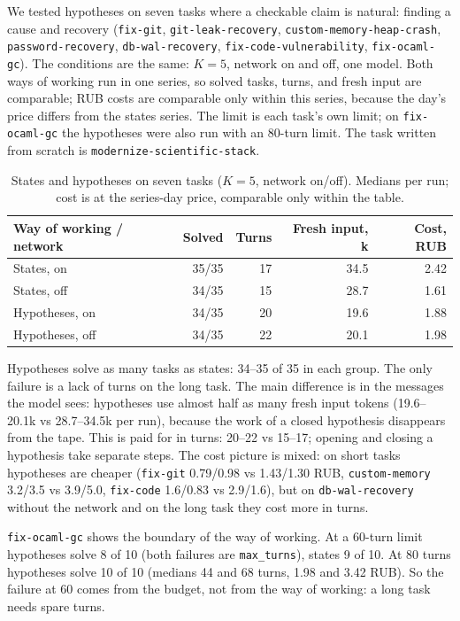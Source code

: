 \documentclass[11pt,a4paper]{article}
\begin{document}
We tested hypotheses on seven tasks where a checkable claim is natural: finding a cause and
recovery (\texttt{fix-git}, \texttt{git-leak-recovery}, \texttt{custom-memory-heap-crash},
\texttt{password-recovery}, \texttt{db-wal-recovery}, \texttt{fix-code-vulnerability},
\texttt{fix-ocaml-gc}). The conditions are the same: $K=5$, network on and off, one model. Both
ways of working run in one series, so solved tasks, turns, and fresh input are comparable; RUB
costs are comparable only within this series, because the day's price differs from the states
series. The limit is each task's own limit; on \texttt{fix-ocaml-gc} the hypotheses were also run
with an 80-turn limit. The task written from scratch is \texttt{modernize-scientific-stack}.

\begin{table}[t]
\centering
\small
\caption{States and hypotheses on seven tasks ($K=5$, network on/off). Medians per run; cost is at
the series-day price, comparable only within the table.}
\label{tab:hyp}
\begin{tabular}{@{}lrrrr@{}}
\toprule
Way of working / network & Solved & Turns & Fresh input, k & Cost, RUB \\
\midrule
States, on & 35/35 & 17 & 34.5 & 2.42 \\
States, off & 34/35 & 15 & 28.7 & 1.61 \\
Hypotheses, on & 34/35 & 20 & 19.6 & 1.88 \\
Hypotheses, off & 34/35 & 22 & 20.1 & 1.98 \\
\bottomrule
\end{tabular}
\end{table}

Hypotheses solve as many tasks as states: 34--35 of 35 in each group. The only failure is a lack
of turns on the long task. The main difference is in the messages the model sees: hypotheses use
almost half as many fresh input tokens (19.6--20.1k vs 28.7--34.5k per run), because the work of a
closed hypothesis disappears from the tape. This is paid for in turns: 20--22 vs 15--17; opening
and closing a hypothesis take separate steps. The cost picture is mixed: on short tasks
hypotheses are cheaper (\texttt{fix-git} 0.79/0.98 vs 1.43/1.30 RUB, \texttt{custom-memory}
3.2/3.5 vs 3.9/5.0, \texttt{fix-code} 1.6/0.83 vs 2.9/1.6), but on \texttt{db-wal-recovery}
without the network and on the long task they cost more in turns.

\texttt{fix-ocaml-gc} shows the boundary of the way of working. At a 60-turn limit hypotheses
solve 8 of 10 (both failures are \texttt{max\_turns}), states 9 of 10. At 80 turns hypotheses
solve 10 of 10 (medians 44 and 68 turns, 1.98 and 3.42 RUB). So the failure at 60 comes from the
budget, not from the way of working: a long task needs spare turns.
\end{document}
